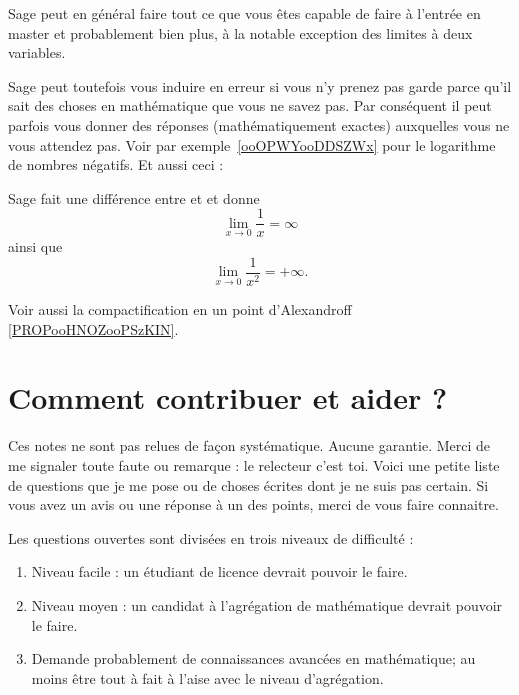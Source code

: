 Sage peut en général faire tout ce que vous êtes capable de faire à l'entrée en master et probablement bien plus, à la notable exception des limites à deux variables.

\begin{remark}
    Sage peut toutefois vous induire en erreur si vous n'y prenez pas garde parce qu'il sait des choses en mathématique que vous ne savez pas. Par conséquent il peut parfois vous donner des réponses (mathématiquement exactes) auxquelles vous ne vous attendez pas. Voir par exemple~\ref{ooOPWYooDDSZWx} pour le logarithme de nombres négatifs. Et aussi ceci :



Sage fait une différence entre  et  et donne
\begin{equation}
    \lim_{x\to 0} \frac{1}{ x }=\infty
\end{equation}
ainsi que
\begin{equation}
    \lim_{x\to 0} \frac{1}{ x^2 }=+\infty.
\end{equation}
\end{remark}

Voir aussi la compactification en un point d'Alexandroff \ref{PROPooHNOZooPSzKIN}.

\section{Comment contribuer et aider ?}
\label{SecooCKWWooBFgnea}

Ces notes ne sont pas relues de façon systématique. Aucune garantie. Merci de me signaler toute faute ou remarque : le relecteur c'est toi. Voici une petite liste de questions que je me pose ou de choses écrites dont je ne suis pas certain. Si vous avez un avis ou une réponse à un des points, merci de vous faire connaitre.

Les questions ouvertes sont divisées en trois niveaux de difficulté :
\begin{enumerate}
    \item
        Niveau facile : un étudiant de licence devrait pouvoir le faire.
    \item
        Niveau moyen : un candidat à l'agrégation de mathématique devrait pouvoir le faire.
    \item
        Demande probablement de connaissances avancées en mathématique; au moins être tout à fait à l'aise avec le niveau d'agrégation.
\end{enumerate}

